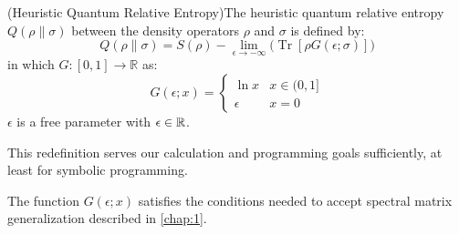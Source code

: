 \begin{definition}(Heuristic Quantum Relative Entropy)The heuristic quantum relative entropy $Q(\rho \| \sigma)$ between the density operators $\rho$ and $\sigma$ is defined by:
\label{heuristickulback}
\begin{equation}
Q(\rho \| \sigma)= S(\rho)-\lim_{\epsilon \to -\infty} \big( \operatorname{Tr}[\rho  G(\epsilon; \sigma)] \big)
\end{equation}
in which $G: [0,1] \rightarrow \mathbb{R}$ as:
\begin{equation}
G(\epsilon;x)=
\begin{cases}
   \ln x   &   x \in (0,1] \\
   \epsilon  &   x=0
\end{cases}
\end{equation}
$\epsilon$ is a free parameter with $\epsilon \in \mathbb{R}$.
\end{definition}
\noindent
This redefinition serves our calculation and programming goals sufficiently, at least for symbolic programming.
\begin{note}
The function $G(\epsilon;x)$ satisfies the conditions needed to accept spectral matrix generalization described in \autoref{chap:1}.
\end{note}